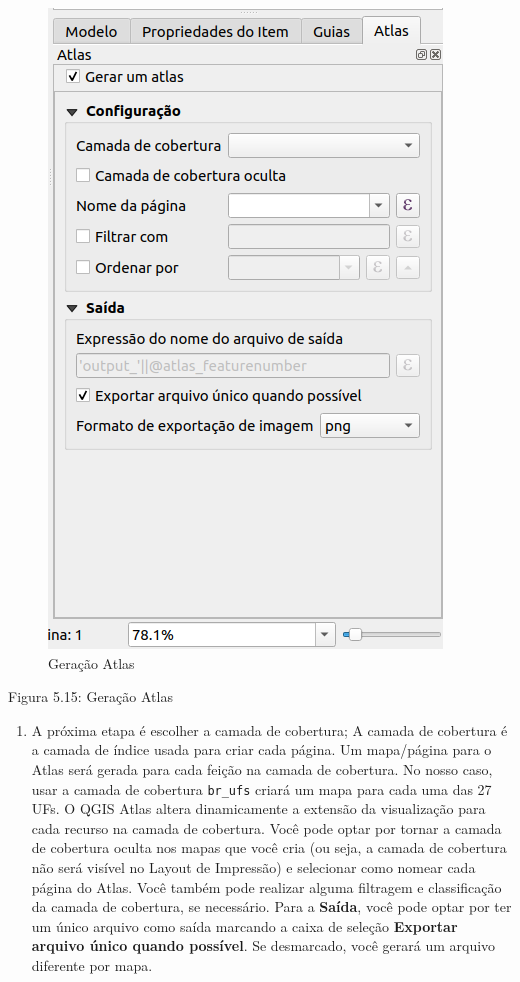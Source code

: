 \documentclass[
  portuguese,
]{krantz}
\providecommand{\tightlist}{%
  \setlength{\itemsep}{0pt}\setlength{\parskip}{0pt}}
\begin{document}
\begin{figure}
\centering
\includegraphics{media/modulo5/generate-atlas.png}
\caption{Geração Atlas}
\end{figure}

Figura 5.15: Geração Atlas

\begin{enumerate}
\def\labelenumi{\arabic{enumi}.}
\setcounter{enumi}{2}
\tightlist
\item
  A próxima etapa é escolher a camada de cobertura; A camada de cobertura é a camada de índice usada para criar cada página. Um mapa/página para o Atlas será gerada para cada feição na camada de cobertura. No nosso caso, usar a camada de cobertura \texttt{br\_ufs} criará um mapa para cada uma das 27 UFs. O QGIS Atlas altera dinamicamente a extensão da visualização para cada recurso na camada de cobertura. Você pode optar por tornar a camada de cobertura oculta nos mapas que você cria (ou seja, a camada de cobertura não será visível no Layout de Impressão) e selecionar como nomear cada página do Atlas. Você também pode realizar alguma filtragem e classificação da camada de cobertura, se necessário. Para a \textbf{Saída}, você pode optar por ter um único arquivo como saída marcando a caixa de seleção \textbf{Exportar arquivo único quando possível}. Se desmarcado, você gerará um arquivo diferente por mapa.
\end{enumerate}
\end{document}
